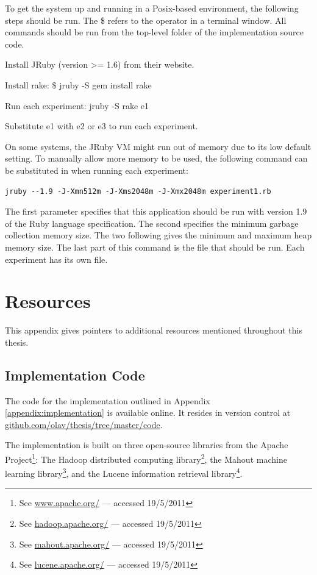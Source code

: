 To get the system up and running in a Posix-based environment, 
the following steps should be run.
The \textsf{\$} refers to the operator in a terminal window.
All commands should be run from the top-level folder of the implementation source code.

\begin{enumerate*}
  \item Install JRuby (version >= 1.6) from their website.
  \item Install rake: \textsf{\$ jruby -S gem install rake}
  \item Run each experiment: \textsf{jruby -S rake e1}
  \item Substitute \textsf{e1} with \textsf{e2} or \textsf{e3} to run each experiment.
\end{enumerate*}

On some systems, the JRuby VM might run out of memory due to its low default setting.
To manually allow more memory to be used, the following command
can be substituted in when running each experiment:

{
\footnotesize
\begin{verbatim}
jruby --1.9 -J-Xmn512m -J-Xms2048m -J-Xmx2048m experiment1.rb
\end{verbatim}
}

The first parameter specifies that this application should be run with version 1.9 of the Ruby language specification.
The second specifies the minimum garbage collection memory size.
The two following gives the minimum and maximum heap memory size.
The last part of this command is the file that should be run.
Each experiment has its own file.


\chapter{Resources}
\label{appendix:resources}

This appendix gives pointers to additional resources mentioned throughout this thesis.

\section{Implementation Code}

The code for the implementation outlined in Appendix \ref{appendix:implementation} is available online.
It resides in version control at 
\url{github.com/olav/thesis/tree/master/code}.

The implementation is built on three open-source libraries from the
Apache Project\footnote{See \url{www.apache.org/} --- accessed 19/5/2011}:
The Hadoop distributed computing library\footnote{See \url{hadoop.apache.org/} --- accessed 19/5/2011},
the Mahout machine learning library\footnote{See \url{mahout.apache.org/} --- accessed 19/5/2011},
and the Lucene information retrieval library\footnote{See \url{lucene.apache.org/} --- accessed 19/5/2011}.

